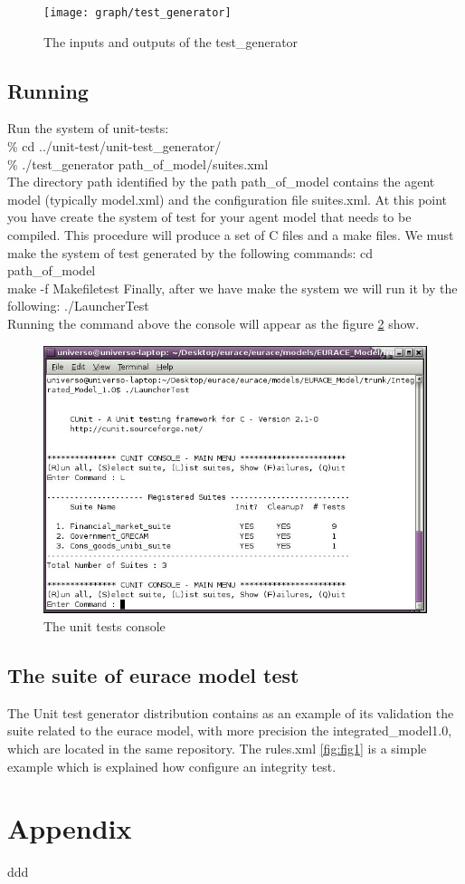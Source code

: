\documentclass[a4paper,10pt]{article}
\begin{document}
 \begin{figure}
 \label{fig:fig5}
\centering
\texttt{[image: graph/test\_generator]} 
\caption{The inputs and outputs of the test\_generator }
\end{figure}
\subsection{Running}
Run the system of unit-tests:\\
\% cd ../unit-test/unit-test\_generator/\\
\% ./test\_generator  path\_of\_model/suites.xml \\
The directory path identified by the path path\_of\_model contains the agent model (typically model.xml) and the configuration file suites.xml.
At this point you have create the system of test for your agent model that  needs to be compiled. This procedure will produce a set of C files and a make files.
We must make the system of test generated by the following commands: 
cd path\_of\_model\\
make -f Makefiletest
Finally, after we have make the system  we will run it by the following:
./LauncherTest \\
Running the command above the console will appear as the figure \ref{fig:fig6} show.
 \begin{figure}
 \label{fig:fig6}
\centering
\includegraphics[scale=0.7]{images/console} 
\caption{The unit tests console }
\end{figure}
\subsection{The suite of eurace model test }
The Unit test generator distribution contains as an  example of its validation  the suite related to the eurace model, with more precision the integrated\_model1.0, which are located in the same repository.
The rules.xml \ref{fig:fig1} is a simple example which is explained how configure an integrity test.
\section{Appendix}
ddd
\end{document}
